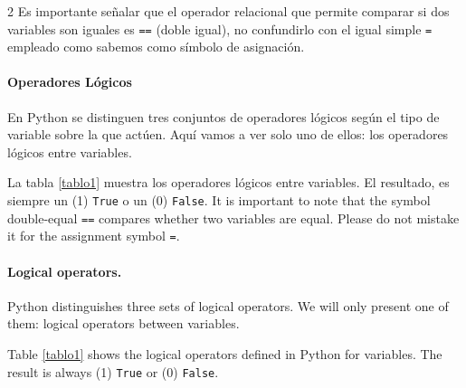 \begin{paracol}{2}
Es importante señalar que el operador relacional que permite comparar si dos variables son iguales es \texttt{==} (doble igual), no confundirlo con el igual simple \texttt{=} empleado como sabemos como símbolo de asignación.

\paragraph{Operadores Lógicos}
En Python se distinguen tres conjuntos de operadores lógicos según el tipo de variable sobre la que actúen. Aquí vamos a ver solo uno de ellos: los operadores lógicos entre variables.

La tabla \ref{tablo1} muestra los operadores lógicos entre variables. El resultado, es siempre un (1) \texttt{True} o un (0) \texttt{False}.
\switchcolumn
It is important to note that the symbol double-equal \texttt{==} compares whether two variables are equal. Please do not mistake it for the assignment symbol \texttt{=}.

\paragraph{Logical operators.} Python distinguishes three sets of logical operators. We will only present one of them: logical operators between variables. 

Table \ref{tablo1} shows the logical operators defined in Python for variables. The result is always (1) \texttt{True} or (0) \texttt{False}.
\end{paracol}

